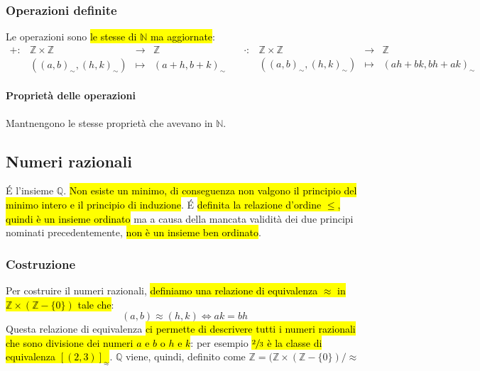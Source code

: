 \subsubsection{Operazioni definite} 
Le operazioni sono \hl{le stesse di $\mathbb{N}$ ma aggiornate}:
\[
    \begin{array}{cccc}
        +: &\mathbb{Z} \times \mathbb{Z} &\to &\mathbb{Z} \\
        &((a, b)_{\sim}, (h,k)_{\sim}) &\mapsto & (a+h, b+k)_{\sim}
    \end{array} \quad
    \begin{array}{cccc}
        \cdot: &\mathbb{Z} \times \mathbb{Z} &\to &\mathbb{Z} \\
        &((a, b)_{\sim}, (h,k)_{\sim}) &\mapsto & (ah + bk, bh + ak)_{\sim}
    \end{array}
\]

\paragraph{Proprietà delle operazioni} Mantnengono le stesse proprietà che 
avevano in $\mathbb{N}$.

\subsection{Numeri razionali}
\'E l'insieme $\mathbb{Q}$. \hl{Non esiste un minimo, di conseguenza non valgono 
il principio del minimo intero e il principio di induzione}. \'E \hl{definita la
relazione d'ordine $\leq$, quindi è un insieme ordinato} ma a causa della
mancata validità dei due principi nominati precedentemente, \hl{non è un insieme
ben ordinato}.

\subsubsection{Costruzione}
Per costruire il numeri razionali, \hl{definiamo una relazione di equivalenza 
$\approx$ in $\mathbb{Z} \times (\mathbb{Z} - \{0\})$ tale che}:
\[ (a,b) \approx (h,k) \iff ak=bh \]
Questa relazione di equivalenza \hl{ci permette di descrivere tutti i numeri razionali
che sono divisione dei numeri $a$ e $b$ o $h$ e $k$}: per esempio \hl{$\sfrac{2}{3}$
è la classe di equivalenza $[(2,3)]_{\approx}$}. $\mathbb{Q}$ viene, quindi, 
definito come $\mathbb{Z} = (\mathbb{Z} \times (\mathbb{Z} - \{0\}) / \approx$

